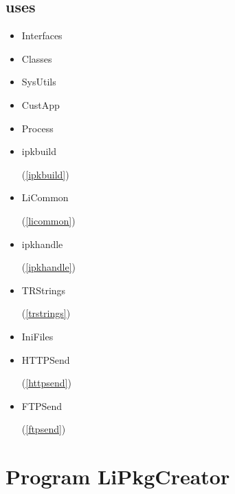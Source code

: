 \documentclass{report}
\begin{document}
\section{uses}
\begin{itemize}
\item \begin{ttfamily}Interfaces\end{ttfamily}\item \begin{ttfamily}Classes\end{ttfamily}\item \begin{ttfamily}SysUtils\end{ttfamily}\item \begin{ttfamily}CustApp\end{ttfamily}\item \begin{ttfamily}Process\end{ttfamily}\item \begin{ttfamily}ipkbuild\end{ttfamily}(\ref{ipkbuild})\item \begin{ttfamily}LiCommon\end{ttfamily}(\ref{licommon})\item \begin{ttfamily}ipkhandle\end{ttfamily}(\ref{ipkhandle})\item \begin{ttfamily}TRStrings\end{ttfamily}(\ref{trstrings})\item \begin{ttfamily}IniFiles\end{ttfamily}\item \begin{ttfamily}HTTPSend\end{ttfamily}(\ref{httpsend})\item \begin{ttfamily}FTPSend\end{ttfamily}(\ref{ftpsend})\end{itemize}
\chapter{Program LiPkgCreator}
\label{LiPkgCreator}
\end{document}
